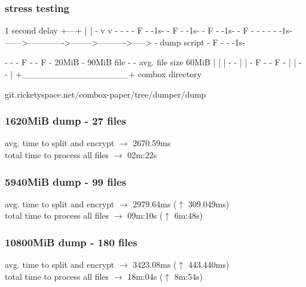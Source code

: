 \begin{frame}[fragile]
  \frametitle{stress testing}
  \pause
  {\tiny
  \begin{semiverbatim}

   1 second delay
        +---+
        |   |
    -   v   v    -            -            -
  - F -  -1s-  - F -  -1s-  - F -  -1s-  - F -
    -            -            -            -    -1s-
------>------------->-------->---------->----->          -
dump script                                            - F -
                                                         -
                                                             -1s-

                                                                 -
   -                                                           - F -
 - F -   20MiB - 90MiB file                                      -
   -
 avg. file size 60MiB                                    |                 |
                                                         |   -         -   |
                                                         | - F -     - F - |
                                                         |   -         -   |
                                                         +_________________+
                                                           combox directory

git.ricketyspace.net/combox-paper/tree/dumper/dump
  \end{semiverbatim} }
\end{frame}


\begin{frame}
  \frametitle{1620MiB dump - 27 files}
  \pause
  \centering
  {\small
  avg. time to split and encrypt $\rightarrow$ 2670.59ms\\
  \pause
  total time to process all files $\rightarrow$ 02m:22s
  }
\end{frame}


\begin{frame}
  \frametitle{5940MiB dump - 99 files}
  \pause
  \centering
  {\small
  avg. time to split and encrypt $\rightarrow$ 2979.64ms ($\uparrow$ 309.049ms)\\
  \pause
  total time to process all files $\rightarrow$ 09m:10s  ($\uparrow$ 6m:48s)
  }
\end{frame}


\begin{frame}
  \frametitle{10800MiB dump - 180 files}
  \pause
  \centering
  {\small
  avg. time to split and encrypt $\rightarrow$ 3423.08ms ($\uparrow$ 443.440ms)\\
  \pause
  total time to process all files $\rightarrow$ 18m:04s ($\uparrow$ 8m:54s)
  }
\end{frame}
